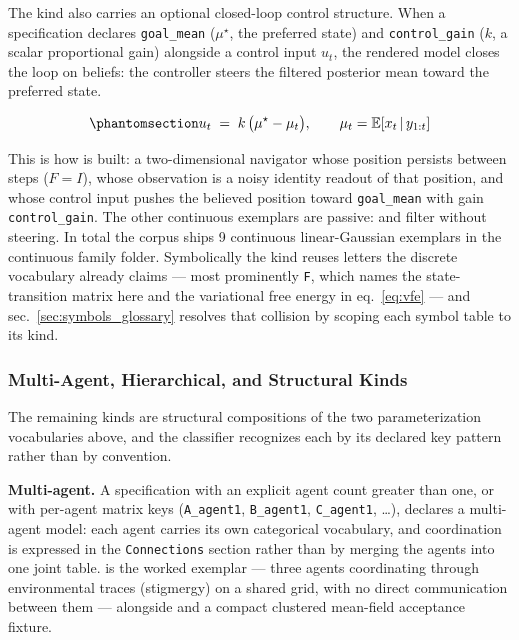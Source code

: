 \documentclass[
  english,
  9pt,
]{extarticle}
\begin{document}
The kind also carries an optional closed-loop control structure. When a
specification declares \texttt{goal\_mean} (\(\mu^\star\), the preferred
state) and \texttt{control\_gain} (\(k\), a scalar proportional gain)
alongside a control input \(u_t\), the rendered model closes the loop on
beliefs: the controller steers the filtered posterior mean toward the
preferred state.

\begin{equation}\protect\phantomsection\label{eq:closed_loop}{
u_t \;=\; k \,\bigl(\mu^\star - \mu_t\bigr), \qquad \mu_t = \mathbb{E}\!\left[x_t \,\middle|\, y_{1:t}\right]
}\end{equation}

This is how
 is built:
a two-dimensional navigator whose position persists between steps
(\(F = I\)), whose observation is a noisy identity readout of that
position, and whose control input pushes the believed position toward
\texttt{goal\_mean} with gain \texttt{control\_gain}. The other
continuous exemplars are passive: 
and  filter without steering. In total
the corpus ships 9 continuous linear-Gaussian exemplars in the
continuous family folder. Symbolically the kind reuses letters the
discrete vocabulary already claims --- most prominently \texttt{F},
which names the state-transition matrix here and the variational free
energy in eq.~\ref{eq:vfe} --- and sec.~\ref{sec:symbols_glossary}
resolves that collision by scoping each symbol table to its kind.

\subsubsection{Multi-Agent, Hierarchical, and Structural
Kinds}\label{sec:structural_variants}

The remaining kinds are structural compositions of the two
parameterization vocabularies above, and the classifier recognizes each
by its declared key pattern rather than by convention.

\textbf{Multi-agent.} A specification with an explicit agent count
greater than one, or with per-agent matrix keys (\texttt{A\_agent1},
\texttt{B\_agent1}, \texttt{C\_agent1}, \ldots), declares a multi-agent
model: each agent carries its own categorical vocabulary, and
coordination is expressed in the \texttt{Connections} section rather
than by merging the agents into one joint table.
 is the worked
exemplar --- three agents coordinating through environmental traces
(stigmergy) on a shared grid, with no direct communication between them
--- alongside  and a compact
clustered mean-field acceptance fixture.
\end{document}
